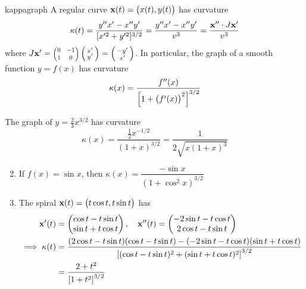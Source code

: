 \begin{cor}{}{kappagraph}
	A regular curve ${\mathbf{x}}(t)=\bigl(x(t),y(t)\bigr)$ has curvature
	\[
		\kappa(t)=\frac{y''x'-x''y'}{[x'^2+y'^2]^{3/2}} =\frac{y''x'-x''y'}{v^3} =\frac{{\mathbf{x}}''\cdot J{\mathbf{x}}'}{v^3}
	\]
	where $J\vx'=\scalebox{0.75}{$\begin{pmatrix}
	0&-1\\1&0
	\end{pmatrix}$}\stwovec{x'}{y'}=\stwovec{-y'}{x'}$. In particular, the graph of a smooth function $y=f(x)$ has curvature
	\[
		\kappa(x)=\frac{f''(x)}{\Bigl[1+\bigl(f'(x)\bigr)^2\Bigr]^{3/2}}
	\]
\end{cor}


\begin{examples}{}{}
	\exstart The graph of $y=\frac 23x^{3/2}$ has curvature
	\[
		\kappa(x)=\frac{\frac 12x^{-1/2}}{(1+x)^{3/2}}= \frac 1{2\sqrt{x(1+x)^3}}
	\]
	\begin{enumerate}\setcounter{enumi}{1}
	  \item If $f(x)=\sin x$, then $\kappa(x)=\dfrac{-\sin x}{(1+\cos^2\!x)^{3/2}}$
	  \item The spiral ${\mathbf{x}}(t)=\bigl(t\cos t,t\sin t\bigr)$ has
	  \begin{align*}
		  {\mathbf{x}}'(t)&=\begin{pmatrix}\cos t-t\sin t\\\sin t+t\cos t\end{pmatrix},\quad {\mathbf{x}}''(t)=\begin{pmatrix}-2\sin t-t\cos t\\2\cos t-t\sin t\end{pmatrix}\\
		  \implies \kappa(t)&=\frac{(2\cos t-t\sin t)(\cos t-t\sin t)-(-2\sin t-t\cos t)(\sin t+t\cos t)}{\left[(\cos t-t\sin t)^2+(\sin t+t\cos t)^2\right]^{3/2}}\\
		  &=\frac{2+t^2}{\left[1+t^2\right]^{3/2}}
	  \end{align*}
\end{enumerate}
\end{examples}


\clearpage

